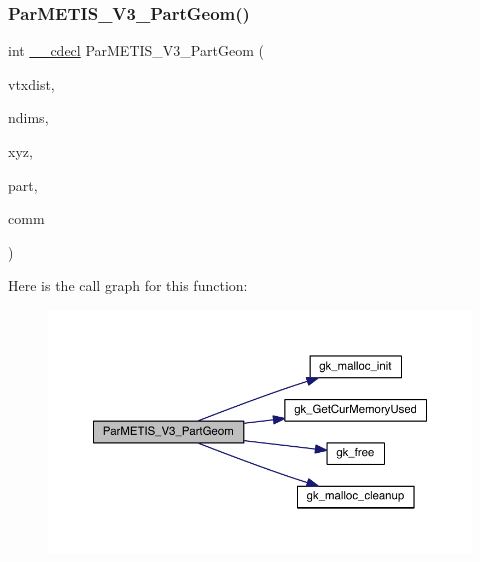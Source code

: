 \mbox{\label{a00843_aab31b6450a3228063206eddded9de65e}} 
\subsubsection{\texorpdfstring{Par\+M\+E\+T\+I\+S\+\_\+\+V3\+\_\+\+Part\+Geom()}{ParMETIS\_V3\_PartGeom()}}
{\footnotesize\ttfamily int \hyperlink{a00843_a238347d7669f8f1e9c83bfe63a2730c4}{\+\_\+\+\_\+cdecl} Par\+M\+E\+T\+I\+S\+\_\+\+V3\+\_\+\+Part\+Geom (\begin{DoxyParamCaption}\item[{\hyperlink{a00876_aaa5262be3e700770163401acb0150f52}{idx\+\_\+t} $\ast$}]{vtxdist,  }\item[{\hyperlink{a00876_aaa5262be3e700770163401acb0150f52}{idx\+\_\+t} $\ast$}]{ndims,  }\item[{\hyperlink{a00876_a1924a4f6907cc3833213aba1f07fcbe9}{real\+\_\+t} $\ast$}]{xyz,  }\item[{\hyperlink{a00876_aaa5262be3e700770163401acb0150f52}{idx\+\_\+t} $\ast$}]{part,  }\item[{M\+P\+I\+\_\+\+Comm $\ast$}]{comm }\end{DoxyParamCaption})}

Here is the call graph for this function\+:\nopagebreak
\begin{figure}[H]
\begin{center}
\leavevmode
\includegraphics[width=350pt]{a00843_aab31b6450a3228063206eddded9de65e_cgraph}
\end{center}
\end{figure}
\mbox{\label{a00843_a6df93293cf3d1ccb4659bd1b3091623d}} 
